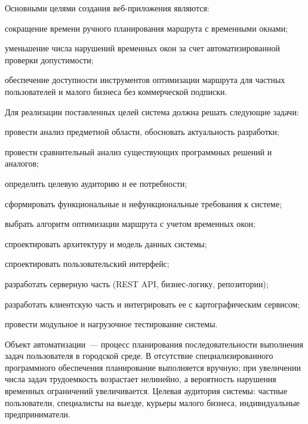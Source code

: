 Основными целями создания веб-приложения являются:
\begin{compactlist}
  \item сокращение времени ручного планирования маршрута с временными окнами;
  \item уменьшение числа нарушений временных окон за счет автоматизированной проверки допустимости;
  \item обеспечение доступности инструментов оптимизации маршрута для частных пользователей и малого бизнеса без коммерческой подписки.
\end{compactlist}

Для реализации поставленных целей система должна решать следующие задачи:
\begin{compactlist}
  \item провести анализ предметной области, обосновать актуальность разработки;
  \item провести сравнительный анализ существующих программных решений и аналогов;
  \item определить целевую аудиторию и ее потребности;
  \item сформировать функциональные и нефункциональные требования к системе;
  \item выбрать алгоритм оптимизации маршрута с учетом временных окон;
  \item спроектировать архитектуру и модель данных системы;
  \item спроектировать пользовательский интерфейс;
  \item разработать серверную часть (REST API, бизнес-логику, репозитории);
  \item разработать клиентскую часть и интегрировать ее с картографическим сервисом;
  \item провести модульное и нагрузочное тестирование системы.
\end{compactlist}


Объект автоматизации~--- процесс планирования последовательности выполнения задач
пользователя в городской среде. В отсутствие специализированного программного
обеспечения планирование выполняется вручную; при увеличении числа задач трудоемкость
возрастает нелинейно, а вероятность нарушения временных ограничений увеличивается.
Целевая аудитория системы: частные пользователи, специалисты на выезде, курьеры малого
бизнеса, индивидуальные предприниматели.

